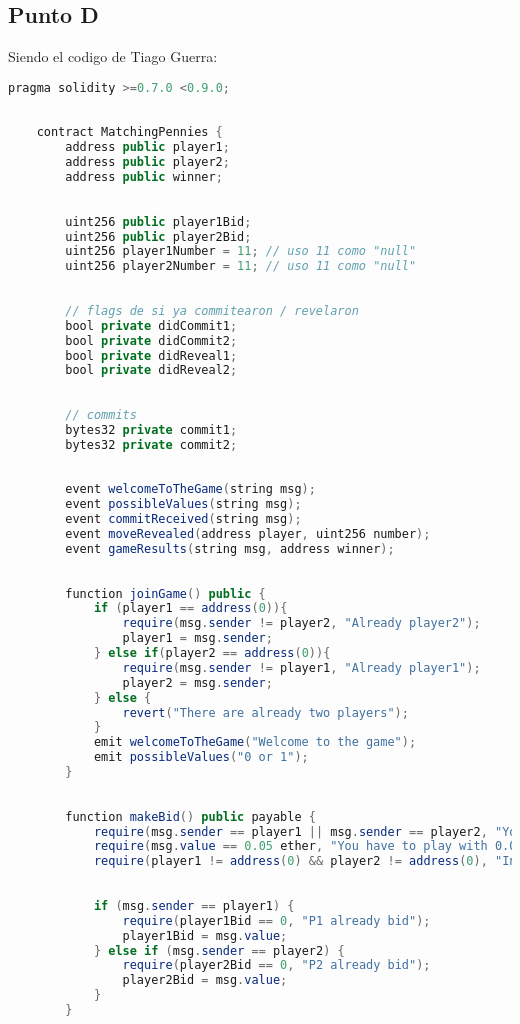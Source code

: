 \documentclass[12pt]{article}
\begin{document}
\subsection*{Punto D}
Siendo el codigo de Tiago Guerra: 
\begin{lstlisting}[language=Java]
    pragma solidity >=0.7.0 <0.9.0;
    
    
    contract MatchingPennies {
        address public player1;
        address public player2;
        address public winner;
    
    
        uint256 public player1Bid;
        uint256 public player2Bid;
        uint256 player1Number = 11; // uso 11 como "null"
        uint256 player2Number = 11; // uso 11 como "null"
    
    
        // flags de si ya commitearon / revelaron
        bool private didCommit1;
        bool private didCommit2;
        bool private didReveal1;
        bool private didReveal2;
    
    
        // commits
        bytes32 private commit1;
        bytes32 private commit2;
    
    
        event welcomeToTheGame(string msg);
        event possibleValues(string msg);
        event commitReceived(string msg);
        event moveRevealed(address player, uint256 number);
        event gameResults(string msg, address winner);
    
    
        function joinGame() public {
            if (player1 == address(0)){
                require(msg.sender != player2, "Already player2");
                player1 = msg.sender;
            } else if(player2 == address(0)){
                require(msg.sender != player1, "Already player1");
                player2 = msg.sender;
            } else {
                revert("There are already two players");
            }
            emit welcomeToTheGame("Welcome to the game");
            emit possibleValues("0 or 1");
        }  
    
    
        function makeBid() public payable {
            require(msg.sender == player1 || msg.sender == player2, "You are not a player");
            require(msg.value == 0.05 ether, "You have to play with 0.05 ether");
            require(player1 != address(0) && player2 != address(0), "Insufficient players");
    
    
            if (msg.sender == player1) {
                require(player1Bid == 0, "P1 already bid");
                player1Bid = msg.value;
            } else if (msg.sender == player2) {
                require(player2Bid == 0, "P2 already bid");
                player2Bid = msg.value;
            }
        }
    

\end{lstlisting}
\end{document}

